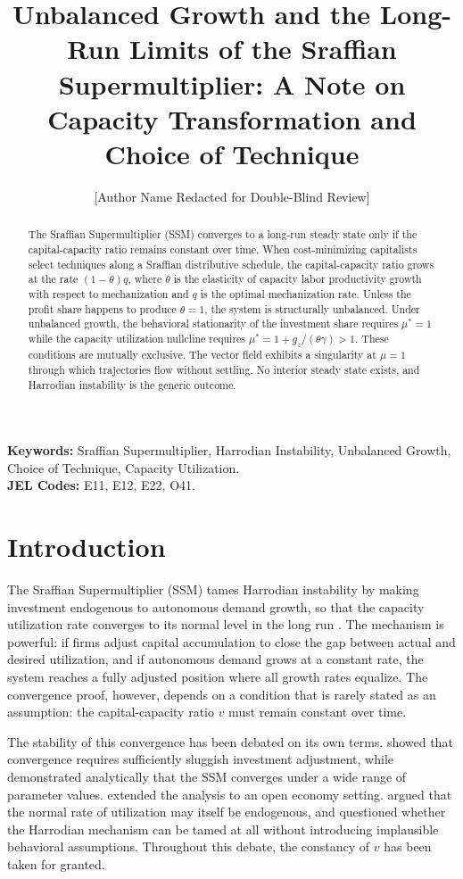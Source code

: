 \documentclass[12pt, a4paper]{article}
\title{Unbalanced Growth and the Long-Run Limits of the Sraffian Supermultiplier: A Note on Capacity Transformation and Choice of Technique}
\author{[Author Name Redacted for Double-Blind Review]}
\date{}
\theoremstyle{definition}
\theoremstyle{remark}
\begin{document}
\maketitle

\begin{abstract}
The Sraffian Supermultiplier (SSM) converges to a long-run steady state only if the capital-capacity ratio remains constant over time. When cost-minimizing capitalists select techniques along a Sraffian distributive schedule, the capital-capacity ratio grows at the rate $(1 - \theta)q$, where $\theta$ is the elasticity of capacity labor productivity growth with respect to mechanization and $q$ is the optimal mechanization rate. Unless the profit share happens to produce $\theta = 1$, the system is structurally unbalanced. Under unbalanced growth, the behavioral stationarity of the investment share requires $\mu^* = 1$ while the capacity utilization nullcline requires $\mu^* = 1 + g_z/(\theta\gamma) > 1$. These conditions are mutually exclusive. The vector field exhibits a singularity at $\mu = 1$ through which trajectories flow without settling. No interior steady state exists, and Harrodian instability is the generic outcome.
\end{abstract}

\noindent \textbf{Keywords:} Sraffian Supermultiplier, Harrodian Instability, Unbalanced Growth, Choice of Technique, Capacity Utilization. \\
\textbf{JEL Codes:} E11, E12, E22, O41.

\vspace{1cm}

\section{Introduction}

The Sraffian Supermultiplier (SSM) tames Harrodian instability by making investment endogenous to autonomous demand growth, so that the capacity utilization rate converges to its normal level in the long run \citep{serrano1995, freitas2015, serrano2017}. The mechanism is powerful: if firms adjust capital accumulation to close the gap between actual and desired utilization, and if autonomous demand grows at a constant rate, the system reaches a fully adjusted position where all growth rates equalize. The convergence proof, however, depends on a condition that is rarely stated as an assumption: the capital-capacity ratio $v$ must remain constant over time.

The stability of this convergence has been debated on its own terms. \citet{allain2015} showed that convergence requires sufficiently sluggish investment adjustment, while \citet{lavoie2016} demonstrated analytically that the SSM converges under a wide range of parameter values. \citet{nah2017} extended the analysis to an open economy setting. \citet{nikiforos2013} argued that the normal rate of utilization may itself be endogenous, and \citet{skott2017} questioned whether the Harrodian mechanism can be tamed at all without introducing implausible behavioral assumptions. Throughout this debate, the constancy of $v$ has been taken for granted.
\end{document}
